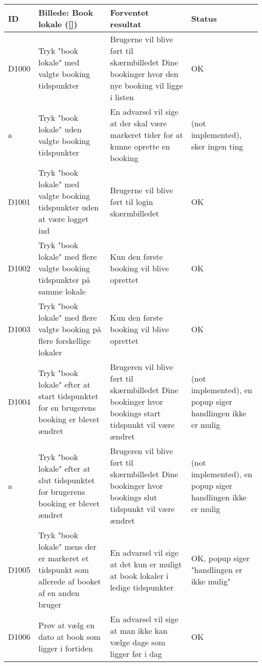 \begin{longtable}{ |p{0.85cm}| p{7cm} | p{7.15cm} | p{1cm} | }
\hline
ID & Billede: Book lokale (\ref{})  & Forventet resultat & Status\\ 
\hline
D1000 & Tryk "book lokale" med valgte booking tidspunkter & Brugerne vil blive ført til skærmbilledet Dine bookinger hvor den nye booking vil ligge i listen & OK\\
\hline
a & Tryk "book lokale" uden valgte booking tidspunkter & En advarsel vil sige at der skal være markeret tider for at kunne oprette en booking &(not implemented), sker ingen ting \\
\hline
D1001 & Tryk "book lokale" med valgte booking tidspunkter uden at være logget ind & Brugerne vil blive ført til login skærmbilledet  & OK \\
\hline
D1002 & Tryk "book lokale" med flere valgte booking tidspunkter på samme lokale &  Kun den første booking vil blive oprettet & OK\\
\hline
D1003 & Tryk "book lokale" med flere valgte booking på flere forskellige lokaler&  Kun den første booking vil blive oprettet & OK \\
\hline
D1004 & Tryk "book lokale" efter at start tidspunktet for en brugerens booking er blevet ændret & Brugeren vil blive ført til skærmbilledet Dine bookinger hvor bookings start tidspunkt vil være ændret &(not implemented), en popup siger handlingen ikke er mulig \\
\hline
a & Tryk "book lokale" efter at slut tidspunktet for brugerens booking er blevet ændret & Brugeren vil blive ført til skærmbilledet Dine bookinger hvor bookings slut tidspunkt vil være ændret &(not implemented), en popup siger handlingen ikke er mulig \\
\hline
D1005 & Tryk "book lokale" mens der er markeret et tidspunkt som allerede af booket af en anden bruger & En advarsel vil sige at det kun er muligt at book lokaler i ledige tidspunkter & OK, popup siger "handlingen er ikke mulig" \\
\hline
D1006 & Prøv at vælg en dato at book som ligger i fortiden & En advarsel vil sige at man ikke kan vælge dage som ligger før i dag & OK \\
\end{longtable}

